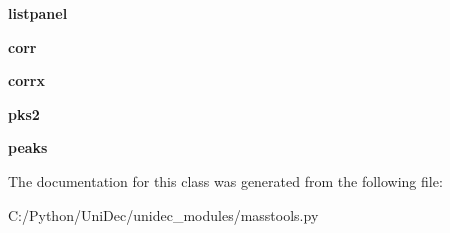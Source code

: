 \begin{DoxyCompactItemize}
\item 
\hypertarget{class_uni_dec_1_1unidec__modules_1_1masstools_1_1_autocorr_window_a804ce092d68f05e16a27966d7fc44dfe}{}{\bfseries listpanel}\label{class_uni_dec_1_1unidec__modules_1_1masstools_1_1_autocorr_window_a804ce092d68f05e16a27966d7fc44dfe}

\item 
\hypertarget{class_uni_dec_1_1unidec__modules_1_1masstools_1_1_autocorr_window_aad97e7f36c6fc8eedcfcff0b737a87c2}{}{\bfseries corr}\label{class_uni_dec_1_1unidec__modules_1_1masstools_1_1_autocorr_window_aad97e7f36c6fc8eedcfcff0b737a87c2}

\item 
\hypertarget{class_uni_dec_1_1unidec__modules_1_1masstools_1_1_autocorr_window_a89fc3d1854f1496d0cfcf9e344091276}{}{\bfseries corrx}\label{class_uni_dec_1_1unidec__modules_1_1masstools_1_1_autocorr_window_a89fc3d1854f1496d0cfcf9e344091276}

\item 
\hypertarget{class_uni_dec_1_1unidec__modules_1_1masstools_1_1_autocorr_window_a0f38efb478d7b7742273b56fd753a35a}{}{\bfseries pks2}\label{class_uni_dec_1_1unidec__modules_1_1masstools_1_1_autocorr_window_a0f38efb478d7b7742273b56fd753a35a}

\item 
\hypertarget{class_uni_dec_1_1unidec__modules_1_1masstools_1_1_autocorr_window_af7b851eeb1e9dc584b22006a0dacd8bd}{}{\bfseries peaks}\label{class_uni_dec_1_1unidec__modules_1_1masstools_1_1_autocorr_window_af7b851eeb1e9dc584b22006a0dacd8bd}

\end{DoxyCompactItemize}


The documentation for this class was generated from the following file\+:\begin{DoxyCompactItemize}
\item 
C\+:/\+Python/\+Uni\+Dec/unidec\+\_\+modules/masstools.\+py\end{DoxyCompactItemize}
